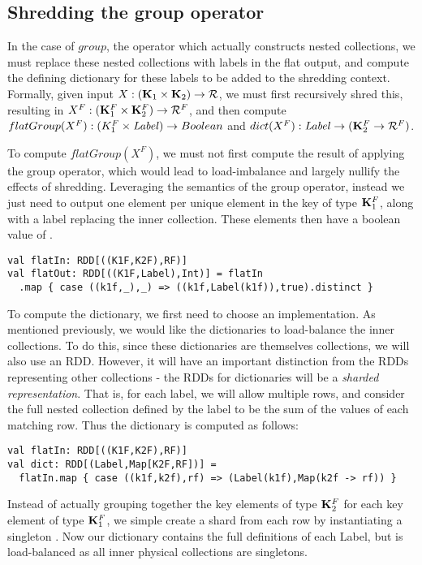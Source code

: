 \subsection{Shredding the group operator}
In the case of $group$, the operator which actually constructs nested collections, we must replace these nested collections with labels in the flat output, and compute the defining dictionary for these labels to be added to the shredding context. Formally, given input $X: (\mathbf{K}_1 \times \mathbf{K}_2) \rightarrow \mathcal{R}$, we must first recursively shred this, resulting in $X^F: (\mathbf{K}_1^F \times \mathbf{K}_2^F) \rightarrow \mathcal{R}^F$, and then compute $flatGroup(X^F): (K_1^F \times \textrm{\textit{Label}}) \rightarrow Boolean$ and $dict(X^F): \textrm{\textit{Label}} \rightarrow (\mathbf{K}_2^F \rightarrow \mathcal{R}^F)$.

To compute $flatGroup(X^F)$, we must not first compute the result of applying the group operator, which would lead to load-imbalance and largely nullify the effects of shredding. Leveraging the semantics of the group operator, instead we just need to output one element per unique element in the key of type $\mathbf{K}_1^F$, along with a label replacing the inner collection. These elements then have a boolean value of .
\vs\begin{lstlisting}
val flatIn: RDD[((K1F,K2F),RF)]
val flatOut: RDD[((K1F,Label),Int)] = flatIn
  .map { case ((k1f,_),_) => ((k1f,Label(k1f)),true).distinct }
\end{lstlisting}\vs

To compute the dictionary, we first need to choose an implementation. As mentioned previously, we would like the dictionaries to load-balance the inner collections. To do this, since these dictionaries are themselves collections, we will also use an RDD. However, it will have an important distinction from the RDDs representing other collections - the RDDs for dictionaries will be a \textit{sharded representation}. That is, for each label, we will allow multiple rows, and consider the full nested collection defined by the label to be the sum of the values of each matching row. Thus the dictionary is computed as follows:
\vs\begin{lstlisting}
val flatIn: RDD[((K1F,K2F),RF)]
val dict: RDD[(Label,Map[K2F,RF])] =
  flatIn.map { case ((k1f,k2f),rf) => (Label(k1f),Map(k2f -> rf)) }
\end{lstlisting}\vs
Instead of actually grouping together the key elements of type $\mathbf{K}_2^F$ for each key element of type $\mathbf{K}_1^F$, we simple create a shard from each row by instantiating a singleton . Now our dictionary contains the full definitions of each Label, but is load-balanced as all inner physical collections are singletons.

